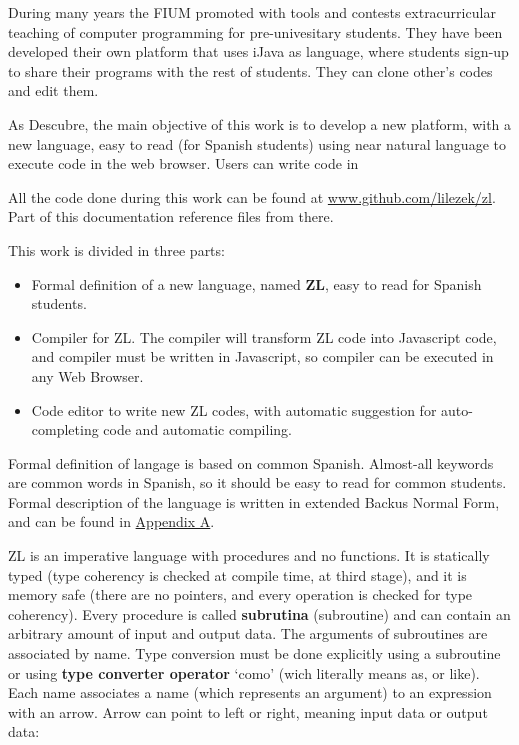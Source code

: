 \documentclass{report}
\begin{document}
	During many years the FIUM promoted with tools and contests extracurricular teaching of computer programming for pre-univesitary students. They have been developed their own platform that uses iJava as language, where students sign-up to share their programs with the rest of students. They can clone other's codes and edit them.
	
	As Descubre, the main objective of this work is to develop a new platform, with a new language, easy to read (for Spanish students) using near natural language to execute code in the web browser. Users can write code in 
	
	All the code done during this work can be found at \url{www.github.com/lilezek/zl}. Part of this documentation reference files from there. 
	
	This work is divided in three parts:
	
	\begin{itemize}
		\item Formal definition of a new language, named \textbf{ZL}, easy to read for Spanish students.
		\item Compiler for ZL. The compiler will transform ZL code into Javascript code, and compiler must be written in Javascript, so compiler can be executed in any Web Browser.
		\item Code editor to write new ZL codes, with automatic suggestion for auto-completing code and automatic compiling.
	\end{itemize} 
	
	Formal definition of langage is based on common Spanish. Almost-all keywords are common words in Spanish, so it should be easy to read for common students. Formal description of the language is written in extended Backus Normal Form, and can be found in \hyperref[app:a]{Appendix A}.
	
	ZL is an imperative language with procedures and no functions. It is statically typed (type coherency is checked at compile time, at third stage), and it is memory safe (there are no pointers, and every operation is checked for type coherency). Every procedure is called \textbf{subrutina} (subroutine) and can contain an arbitrary amount of input and output data. The arguments of subroutines are associated by name. Type conversion must be done explicitly using a subroutine or using \textbf{type converter operator} `como' (wich literally means as, or like). Each name associates a name (which represents an argument) to an expression with an arrow. Arrow can point to left or right, meaning input data or output data: 
	
\end{document}

